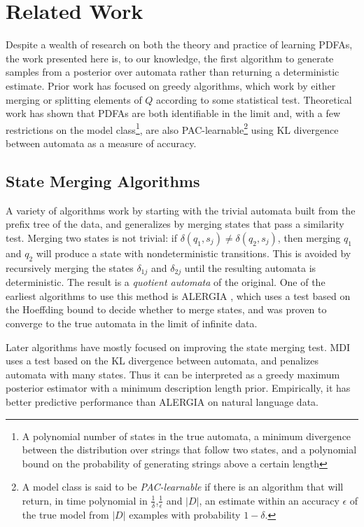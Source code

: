 \section{Related Work}

Despite a wealth of research on both the theory and practice of learning PDFAs, the work presented here is, to our knowledge, the first algorithm to generate samples from a posterior over automata rather than returning a deterministic estimate.  Prior work has focused on greedy algorithms, which work by either merging or splitting elements of $Q$ according to some statistical test.  Theoretical work has shown that PDFAs are both identifiable in the limit and, with a few restrictions on the model class\footnote{A polynomial number of states in the true automata, a minimum divergence between the distribution over strings that follow two states, and a polynomial bound on the probability of generating strings above a certain length}, are also PAC-learnable\footnote{A model class is said to be {\em PAC-learnable} if there is an algorithm that will return, in time polynomial in $\frac{1}{\delta}$,$\frac{1}{\epsilon}$ and $|D|$, an estimate within an accuracy $\epsilon$ of the true model from $|D|$ examples with probability $1-\delta$.} using KL divergence between automata as a measure of accuracy.

\subsection{State Merging Algorithms}
A variety of algorithms work by starting with the trivial automata built from the prefix tree of the data, and generalizes by merging states that pass a similarity test.  Merging two states is not trivial: if $\delta(q_1,s_j) \ne \delta(q_2,s_j)$, then merging $q_1$ and $q_2$ will produce a state with nondeterministic transitions.  This is avoided by recursively merging the states $\delta_{1j}$ and $\delta_{2j}$ until the resulting automata is deterministic.  The result is a {\em quotient automata} of the original.  One of the earliest algorithms to use this method is ALERGIA \cite{Oncina1994}, which uses a test based on the Hoeffding bound to decide whether to merge states, and was proven to converge to the true automata in the limit of infinite data.

Later algorithms have mostly focused on improving the state merging test.  MDI uses a test based on the KL divergence between automata, and penalizes automata with many states.  Thus it can be interpreted as a greedy maximum posterior estimator with a minimum description length prior.  Empirically, it has better predictive performance than ALERGIA on natural language data.

